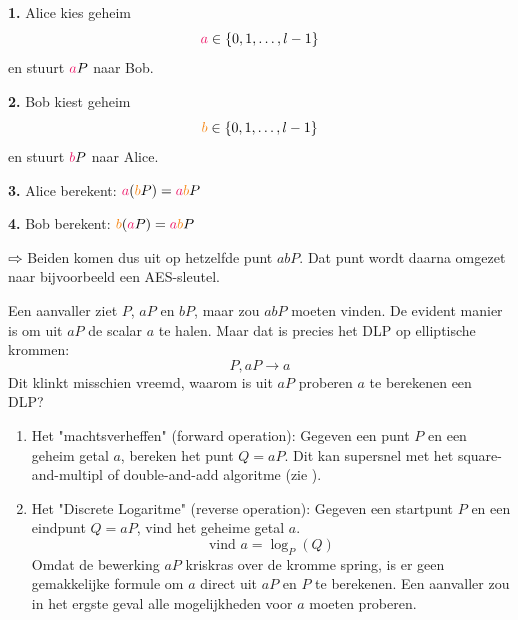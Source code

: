
\textbf{1.} Alice kies \textcolor{WildStrawberry}{geheim}
\begin{equation*}
    \textcolor{WildStrawberry}{a} \in \{0, 1, \dots, l-1\}
\end{equation*}
en stuurt $\textcolor{WildStrawberry}{a}P$ naar Bob.

\textbf{2.} Bob kiest \textcolor{BurntOrange}{geheim}
\begin{equation*}
    \textcolor{BurntOrange}{b} \in \{0, 1, \dots, l-1\}
\end{equation*}
en stuurt $\textcolor{WildStrawberry}{b}P$ naar Alice.

\textbf{3.} Alice berekent: $\textcolor{WildStrawberry}{a}(\textcolor{BurntOrange}{b}P) = \textcolor{WildStrawberry}{a}\textcolor{BurntOrange}{b}P$

\textbf{4.} Bob berekent: $\textcolor{BurntOrange}{b}(\textcolor{WildStrawberry}{a}P) = \textcolor{WildStrawberry}{a}\textcolor{BurntOrange}{b}P$

$\rightwhitearrow$ Beiden komen dus uit op hetzelfde punt $abP$. Dat punt wordt daarna omgezet naar bijvoorbeeld een AES-sleutel.

\begin{center}
\resizebox{0.82\textwidth}{!}{%
    
}
\end{center}


Een aanvaller ziet $P$, $aP$ en $bP$, maar zou $abP$ moeten vinden. De evident manier is om uit $aP$ de scalar $a$ te halen. Maar dat is precies het DLP op elliptische krommen:
\begin{equation*}
    P, aP \longrightarrow a
\end{equation*}
Dit klinkt misschien vreemd, waarom is uit $aP$ proberen $a$ te berekenen een DLP?
\begin{enumerate}
    \item Het "machtsverheffen" (forward operation):\newline
    Gegeven een punt $P$ en een geheim getal $a$, bereken het punt $Q = aP$. Dit kan supersnel met het square-and-multipl of double-and-add algoritme (zie ).

    \item Het "Discrete Logaritme" (reverse operation):\newline
    Gegeven een startpunt $P$ en een eindpunt $Q = aP$, vind het geheime getal $a$.
    \begin{equation*}
        \text{vind } a = \log_P(Q)
    \end{equation*}
    Omdat de bewerking $aP$ kriskras over de kromme spring, is er geen gemakkelijke formule om $a$ direct uit $aP$ en $P$ te berekenen. Een aanvaller zou in het ergste geval alle mogelijkheden voor $a$ moeten proberen.
\end{enumerate}

